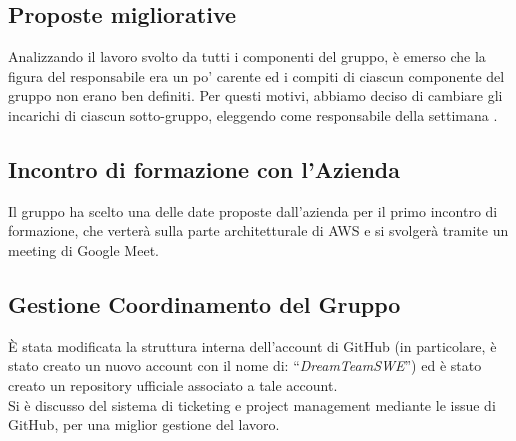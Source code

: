 \subsection{Proposte migliorative}

Analizzando il lavoro svolto da tutti i componenti del gruppo, è emerso che la figura del responsabile era un po' carente ed i compiti di ciascun componente del gruppo non erano ben definiti. Per questi motivi, abbiamo deciso di cambiare gli incarichi di ciascun sotto-gruppo, eleggendo come responsabile della settimana \FP{}. 

\subsection{Incontro di formazione con l'Azienda}

Il gruppo ha scelto una delle date proposte dall'azienda per il primo incontro di formazione, che verterà sulla parte architetturale di AWS\glo{} e si svolgerà tramite un meeting di Google Meet.

\subsection{Gestione Coordinamento del Gruppo}

È stata modificata la struttura interna dell'account di GitHub (in particolare, è stato creato un nuovo account con il nome di: “\textit{DreamTeamSWE}”) ed è stato creato un repository ufficiale associato a tale account. \\
Si è discusso del sistema di ticketing e project management mediante le issue di GitHub, per una miglior gestione del lavoro.   